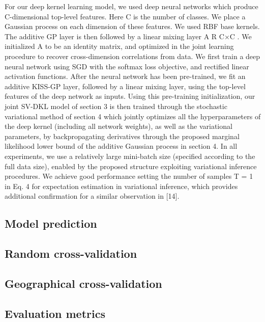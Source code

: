 \documentclass[a4paper, nobind]{templates/cdethesis}
\begin{document}
For our deep kernel learning model, we used deep neural networks which produce
C-dimensional top-level features. Here C is the number of classes. We place a Gaussian process on each dimension of these features. We used RBF base kernels. The additive GP layer is then followed by a linear mixing layer A R C×C . We initialized A to be an identity matrix, and optimized in the joint learning procedure to recover cross-dimension correlations from data.
We first train a deep neural network using SGD with the softmax loss objective, and rectified linear activation functions. After the neural network has been pre-trained, we fit an additive KISS-GP layer, followed by a linear mixing layer, using the top-level features of the deep network as inputs. Using this pre-training initialization, our joint SV-DKL model of section 3 is then trained through the stochastic variational method of section 4 which jointly optimizes all the hyperparameters of the deep kernel (including all network weights), as well as the variational parameters, by backpropagating derivatives through the proposed marginal likelihood lower bound of the additive Gaussian process in section 4. In all experiments, we use a relatively large mini-batch size (specified according to the full data size), enabled by the proposed structure exploiting variational inference procedures. We achieve good performance setting the number of samples T = 1 in Eq. 4 for expectation estimation in variational inference, which provides additional confirmation for a similar observation in {[}14{]}.

\hypertarget{model-prediction}{%
\subsection{Model prediction}\label{model-prediction}}

\hypertarget{random-cross-validation}{%
\subsection{Random cross-validation}\label{random-cross-validation}}

\hypertarget{geographical-cross-validation}{%
\subsection{Geographical cross-validation}\label{geographical-cross-validation}}

\hypertarget{evaluation-metrics}{%
\subsection{Evaluation metrics}\label{evaluation-metrics}}
\end{document}
